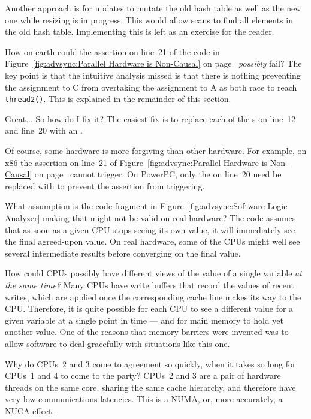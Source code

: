 \begin{enumerate}
	Another approach is for updates to mutate the old hash
	table as well as the new one while resizing is in
	progress.
	This would allow scans to find all elements in the old
	hash table.
	Implementing this is left as an exercise for the reader.

\QuickQ{}
	How on earth could the assertion on line~21 of the code in
	Figure~\ref{fig:advsync:Parallel Hardware is Non-Causal} on
	page~\pageref{fig:advsync:Parallel Hardware is Non-Causal}
	\emph{possibly} fail?
\QuickA{}
	The key point is that the intuitive analysis missed is that
	there is nothing preventing the assignment to C from overtaking
	the assignment to A as both race to reach {\tt thread2()}.
	This is explained in the remainder of this section.

\QuickQ{}
	Great...  So how do I fix it?
\QuickA{}
	The easiest fix is to replace each of the s on
	line~12 and line~20 with an .

	Of course, some hardware is more forgiving than other hardware.
	For example, on x86 the assertion on line~21 of
	Figure~\ref{fig:advsync:Parallel Hardware is Non-Causal} on
	page~\pageref{fig:advsync:Parallel Hardware is Non-Causal}
	cannot trigger.
	On PowerPC, only the  on line~20 need be
	replaced with  to prevent the assertion from
	triggering.

\QuickQ{}
	What assumption is the code fragment
	in Figure~\ref{fig:advsync:Software Logic Analyzer}
	making that might not be valid on real hardware?
\QuickA{}
	The code assumes that as soon as a given CPU stops
	seeing its own value, it will immediately see the
	final agreed-upon value.
	On real hardware, some of the CPUs might well see several
	intermediate results before converging on the final value.

\QuickQ{}
	How could CPUs possibly have different views of the
	value of a single variable \emph{at the same time?}
\QuickA{}
	Many CPUs have write buffers that record the values of
	recent writes, which are applied once the corresponding
	cache line makes its way to the CPU.
	Therefore, it is quite possible for each CPU to see a
	different value for a given variable at a single point
	in time --- and for main memory to hold yet another value.
	One of the reasons that memory barriers were invented was
	to allow software to deal gracefully with situations like
	this one.

\QuickQ{}
	Why do CPUs~2 and 3 come to agreement so quickly, when it
	takes so long for CPUs~1 and 4 to come to the party?
\QuickA{}
	CPUs~2 and 3 are a pair of hardware threads on the same
	core, sharing the same cache hierarchy, and therefore have
	very low communications latencies.
	This is a NUMA, or, more accurately, a NUCA effect.


\end{enumerate}
